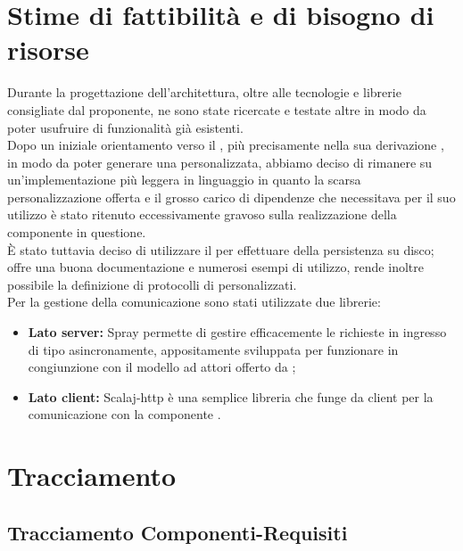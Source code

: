 \documentclass{scalatekids-article}
\begin{document}
\section{Stime di fattibilità e di bisogno di risorse}

Durante la progettazione dell'architettura, oltre alle tecnologie e librerie
consigliate dal proponente, ne sono state ricercate e testate altre in modo da
poter usufruire di funzionalità già esistenti.\\ Dopo un iniziale orientamento
verso il  , più precisamente nella sua
derivazione , in modo da poter generare una 
personalizzata, abbiamo deciso di rimanere su un'implementazione più leggera in
linguaggio  in quanto la scarsa personalizzazione offerta e il
grosso carico di dipendenze che necessitava  per il suo
utilizzo è stato ritenuto eccessivamente gravoso sulla realizzazione della
componente in questione.\\ È stato tuttavia deciso di utilizzare il
  per effettuare  della
persistenza su disco; offre una buona documentazione e numerosi esempi di
utilizzo, rende inoltre possibile la definizione di protocolli di
 personalizzati.\\
Per la gestione della comunicazione  sono stati utilizzate due librerie:
\begin{itemize}
\item\textbf{Lato server:} Spray permette di gestire efficacemente le richieste in ingresso
  di tipo  asincronamente, appositamente sviluppata per funzionare in congiunzione
  con il modello ad attori offerto da ;
\item\textbf{Lato client:} Scalaj-http è una semplice libreria  che funge da client
   per la comunicazione con la componente .
\end{itemize}

\section{Tracciamento}

\subsection{Tracciamento Componenti-Requisiti}
\end{document}
